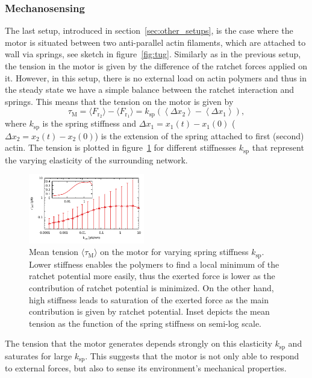 \documentclass[aps,pre,twocolumn,showpacs,showkeys,superscriptaddress,floatfix]{revtex4-1}
\begin{document}
\subsubsection{Mechanosensing}
\label{sec:mechanosensing}
The last setup, introduced in section~\ref{sec:other_setups}, is the case where the motor is situated between two anti-parallel actin filaments, which are attached to wall via springs, see sketch in figure~\ref{fig:tug}. 
Similarly as in the previous setup, the tension in the motor is given by the difference of the ratchet forces applied on it.
However, in this setup, there is no external load on actin polymers and thus in the steady state we have a simple balance between the ratchet interaction and springs. 
This means that the tension on the motor is given by
\[
\tau_\text{M} 
= \langle F_{\text{r}_2}\rangle - \langle F_{\text{r}_1} \rangle 
= k_\text{sp} \left( \left\langle \Delta x_2 \right\rangle - \left\langle \Delta x_1 \right\rangle \right) ,
\]
where $k_\text{sp}$ is the spring stiffness and $\Delta x_1 = x_1(t) - x_1(0)$ ($\Delta x_2 = x_2(t) - x_2(0)$) is the extension of the spring attached to first (second) actin. 
The tension is plotted in figure~\ref{fig:tug_k} for different stiffnesses $k_\text{sp}$ that represent the varying elasticity of the surrounding network.
\begin{figure}[t]
\centering
\includegraphics[width=0.45\textwidth,height=!]{tug_k}
\caption{
\label{fig:tug_k}
Mean tension $\langle \tau_\text{M} \rangle$ on the motor for varying spring stiffness $k_\text{sp}$.
Lower stiffness enables the polymers to find a local minimum of the ratchet potential more easily, 
thus the exerted force is lower as the contribution of ratchet potential is minimized. 
On the other hand, high stiffness leads to saturation of the exerted force as the main contribution is given by ratchet potential. 
Inset depicts the mean tension as the function of the spring stiffness on semi-log scale. 
}
\end{figure}
The tension that the motor generates depends strongly on this elasticity $k_\text{sp}$ and saturates for large $k_\text{sp}$. 
This suggests that the motor is not only able to respond to external forces, but also to sense its environment's mechanical properties.
\end{document}
